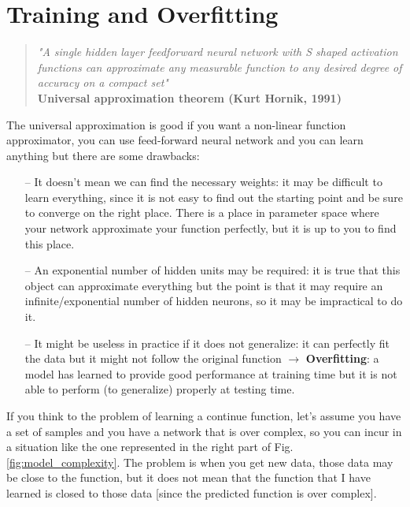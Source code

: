\section{Training and Overfitting}
\begin{quote}
    \textit{"A single hidden layer feedforward neural network with S shaped activation functions can approximate any measurable function to any desired degree of accuracy on a compact set"} \\
    \textbf{Universal approximation theorem (Kurt Hornik, 1991)}
\end{quote}

The universal approximation is good if you want a non-linear function approximator, you can use feed-forward neural network and you can learn anything but there are some drawbacks: 
\begin{itemize}
    \item[--] It doesn’t mean we can find the necessary weights: it may be difficult to learn everything, since it is not easy to find out the starting point and be sure to converge on the right place. There is a place in parameter space where your network approximate your function perfectly, but it is up to you to find this place.
    
    \item[--] An exponential number of hidden units may be required: it is true that this object can approximate everything but the point is that it may require an infinite/exponential number of hidden neurons, so it may be impractical to do it.
    
    \item[--] It might be useless in practice if it does not generalize: it can perfectly fit the data but it might not follow the original function $\rightarrow$ \textbf{Overfitting}: a model has learned to provide good performance at training time but it is not able to perform (to generalize) properly at testing time. 
\end{itemize}{}

 If you think to the problem of learning a continue function, let's assume you have a set of samples and  you have a network that is over complex, so you can incur in a situation like the one represented in the right part of Fig.\ref{fig:model_complexity}. The problem is when you get new data, those data may be close to the function, but it does not mean that the function that I have learned is closed to those data [since the predicted function is over complex]. 
 
